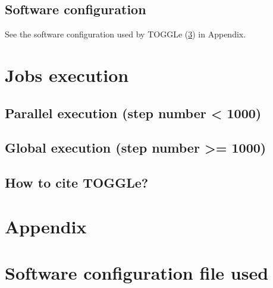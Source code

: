 \documentclass[a4paper]{article}
\begin{document}
\subsection{Software configuration}
See the software configuration used by TOGGLe (\ref{appendix:config})  in Appendix.



 
 
\newpage
\section{Jobs execution}

\subsection{Parallel execution (step number < 1000)}



\subsection{Global execution (step number >= 1000)}




\subsection{How to cite TOGGLe?}

\cite{Monat2015}

\clearpage

%


\clearpage
\section{Appendix}\appendix

\section{ Software configuration file used}
\label{appendix:config}

\end{document}
